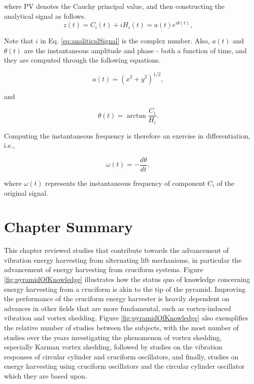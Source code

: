 \documentclass[oneside]{utmthesis}
\begin{document}
\noindent where PV denotes the Cauchy principal value, and then constructing the analytical signal as follows.
\begin{equation}
  z \left( t \right) = C_{i} \left( t \right) + i H_{i} \left( t \right) = a(t)e^{i\theta(t)},
  \label{eq:analiticalSignal}
\end{equation}

\noindent Note that $i$ in Eq. \ref{eq:analiticalSignal} is the complex number.
Also, $a(t)$ and $\theta(t)$ are the instantaneous amplitude and phase - both a function of time, and they are computed through the following equations.

\begin{equation}
  a(t) = \left( x^{2} + y^{2} \right)^{1/2},
  \label{eq:instAmplitude}
\end{equation}

\noindent and

\begin{equation}
  \theta(t) = \arctan{\frac{C_{i}}{H_{i}}}.
  \label{eq:instPhase}
\end{equation}

\noindent Computing the instantaneous frequency is therefore an exercise in differentiation, i.e.,

\begin{equation}
  \omega(t) = - \frac{d\theta}{dt},
  \label{eq:instFrequency}
\end{equation}

\noindent where $\omega(t)$ represents the instantaneous frequency of component $C_{i}$ of the original signal.


\section{Chapter Summary}

\vspace{\baselineskip}

This chapter reviewed studies that contribute towards the advancement of vibration energy harvesting from alternating lift mechanisms, in particular the advancement of energy harvesting from cruciform systems. Figure \ref{fig:pyramidOfKnowledge} illustrates how the status quo of knowledge concerning energy harvesting from a cruciform is akin to the tip of the pyramid. Improving the performance of the cruciform energy harvester is heavily dependent on advances in other fields that are more fundamental, such as vortex-induced vibration and vortex shedding. Figure \ref{fig:pyramidOfKnowledge} also exemplifies the relative number of studies between the subjects, with the most number of studies over the years investigating the phenomenon of vortex shedding, especially Karman vortex shedding, followed by studies on the vibration responses of circular cylinder and cruciform oscillators, and finally, studies on energy harvesting using cruciform oscillators and the circular cylinder oscillator which they are based upon.
\end{document}
